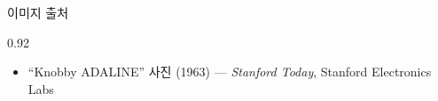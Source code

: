 \begin{frame}{이미지 출처}
\begin{center}\begin{varwidth}{0.92\textwidth}
  \scriptsize
  \begin{itemize}
    \item ``Knobby ADALINE'' 사진 (1963) --- \textit{Stanford Today}, Stanford Electronics Labs
  \end{itemize}
\end{varwidth}\end{center}
\end{frame}
